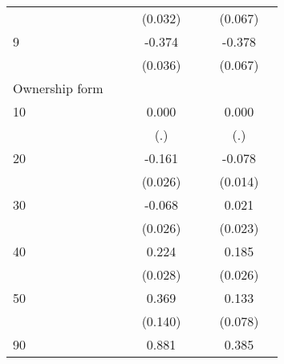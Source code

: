 {\begin{longtable}{l*{3}{c}|l*{3}{c}}
		&                     &                     &     (0.032)         &                     &                     &     (0.067)         \\
		9                   &                     &                     &      -0.374\sym{***}&                     &                     &      -0.378\sym{***}\\
		&                     &                     &     (0.036)         &                     &                     &     (0.067)         \\
		Ownership form &&&&&\\
		10                  &                     &                     &       0.000         &                     &                     &       0.000         \\
		&                     &                     &         (.)         &                     &                     &         (.)         \\
		20                  &                     &                     &      -0.161\sym{***}&                     &                     &      -0.078\sym{***}\\
		&                     &                     &     (0.026)         &                     &                     &     (0.014)         \\
		30                  &                     &                     &      -0.068\sym{**} &                     &                     &       0.021         \\
		&                     &                     &     (0.026)         &                     &                     &     (0.023)         \\
		40                  &                     &                     &       0.224\sym{***}&                     &                     &       0.185\sym{***}\\
		&                     &                     &     (0.028)         &                     &                     &     (0.026)         \\
		50                  &                     &                     &       0.369\sym{**} &                     &                     &       0.133         \\
		&                     &                     &     (0.140)         &                     &                     &     (0.078)         \\
		90                  &                     &                     &       0.881\sym{*}  &                     &                     &       0.385\sym{***}\\

\end{longtable}}
